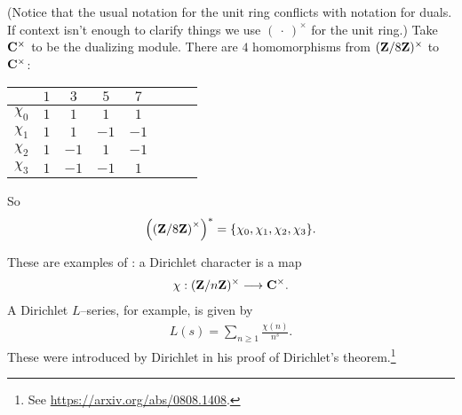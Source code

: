 \documentclass[11pt, oneside,margin=1in]{article}
\begin{document}
\begin{example}\label{}
	(Notice that the usual notation for the unit ring conflicts with notation for duals. If context isn't enough to clarify things we use $(\ \cdot\ )^\times$ for the unit ring.) Take $\mathbf C^\times$ to be the dualizing module. There are $4$ homomorphisms from $(\mathbf Z / 8\mathbf Z) ^\times$ to $\mathbf C^\times$:
	\begin{center}
\begin{tabular}{cccccccc}
    & $1$ & $3$ & $5$ & $7$\\
    \midrule
	$\chi_0$ & $1$ & $1$ & $1$ & $1$\\
	$\chi_1$ & $1$ & $1$ & $-1$ & $-1$\\
$\chi_2$ & $1$ & $-1$ & $1$ & $-1$\\
$\chi_3$ & $1$ & $-1$ & $-1$ & $1$\\

\end{tabular}
\end{center}
So
\begin{align*}
	\left( \left( \mathbf Z / 8\mathbf Z \right) ^\times \right) ^* = \{\chi_0,\chi_1,\chi_2,\chi_3\}.
\end{align*}
\end{example}

These are examples of : a Dirichlet character is a map
 \begin{align*}
	\chi : (\mathbf Z / n\mathbf Z) ^\times \longrightarrow \mathbf C^\times.
\end{align*}
A Dirichlet $L$--series, for example, is given by
\begin{align*}
	L(s)=\sum_{n\ge 1} \frac{\chi(n)}{n^s}.
\end{align*}
These were introduced by Dirichlet in his proof of Dirichlet's theorem.\footnote{See \url{https://arxiv.org/abs/0808.1408}.}
\end{document}
